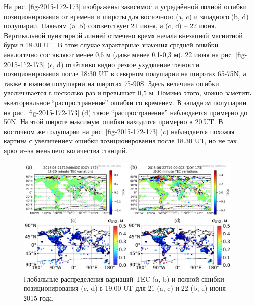 На рис. \ref{fig-2015-172-173} изображены зависимости усреднённой полной ошибки позиционирования от времени и широты для восточного (a, c) и западного (b, d) полушарий. 
Панелям (a, b) соответствует 21 июня, а (c, d) -- 22 июня.
Вертикальной пунктирной линией отмечено время начала внезапной магнитной бури в 18:30 UT. 
В этом случае характерные значения средней ошибки аналогично составляют менее 0,5 м (даже менее 0,1-0,3 м).
22 июня на рис. \ref{fig-2015-172-173} (c, d) отчётливо видно резкое ухудшение точности позиционирования после 18:30 UT в северном полушарии на широтах 65-75\degree N, а также в южном полушарии на широтах 75-90\degree S.
Здесь величина ошибки увеличивается в несколько раз и превышает 0,5 м.
Помимо этого, можно заметить экваториальное ``распространение'' ошибки со временем.
В западном полушарии на рис. \ref{fig-2015-172-173} (d) такое ``распространение'' наблюдается примерно до 50\degree N.
На этой широте максимум ошибки находится примерно в 20 UT.
В восточном же полушарии на рис. \ref{fig-2015-172-173} (c) наблюдается похожая картина с увеличением ошибки позиционирования после 18:30 UT, но не так ярко из-за меньшего количества станций.
\begin{figure}[h]
\includegraphics[width=\textwidth]{fig/2015-172-173-19-00.png}    
\caption{Глобальные распределения вариаций TEC (a, b) и полной ошибки позиционирования (c, d) в 19:00 UT для 21 (a, c) и 22 (b, d) июня 2015 года.}
\label{fig-2015-172-173-19-00}
\end{figure}
